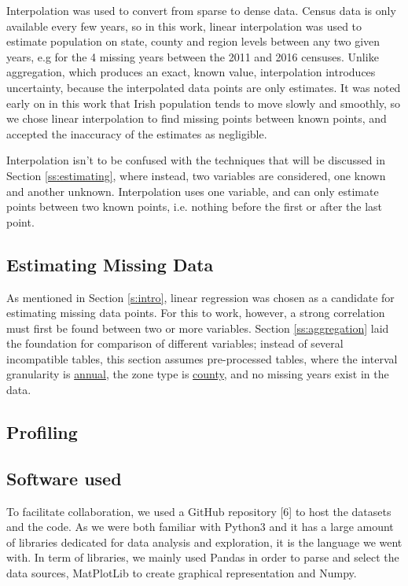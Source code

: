 \documentclass[twocolumn]{article}
\begin{document}
Interpolation was used to convert from sparse to dense data.  Census data
is only available every few years, so in this work, linear interpolation was
used to estimate population on state, county and region levels between any two
given years, e.g for the 4 missing years between the 2011 and 2016 censuses.
Unlike aggregation, which produces an
exact, known value, interpolation introduces uncertainty, because the
interpolated data points are only estimates.  It was noted early on in this
work that Irish population tends to move slowly and smoothly, so we chose
linear interpolation to find missing points between known points, and accepted
the inaccuracy of the estimates as negligible.

Interpolation isn't to be confused with the techniques that will be discussed in
Section \ref{ss:estimating}, where instead, two variables are considered, one known
and another unknown.  Interpolation uses one variable, and can only estimate points between
two known points, i.e. nothing before the first or after the last point.

\subsection{Estimating Missing Data\label{ss:estimating}}
As mentioned in Section \ref{s:intro}, linear regression was chosen as a candidate for
estimating missing data points.  For this to work, however, a strong correlation must first
be found between two or more variables.  Section \ref{ss:aggregation} laid the foundation
for comparison of different variables; instead of several incompatible tables, this section assumes
pre-processed tables, where the interval granularity is \underline{annual}, the zone type is
\underline{county}, and no missing years exist in the data.
\subsection{Profiling\label{ss:profiling}}

\subsection{Software used}
To facilitate collaboration, we used a GitHub repository [6] to host the datasets and the code. As we were both familiar with Python3 and it has a large amount of libraries dedicated for data analysis and exploration, it is the language we went with. In term of libraries, we mainly used Pandas in order to parse and select the data sources, MatPlotLib to create graphical representation and Numpy.
\end{document}
